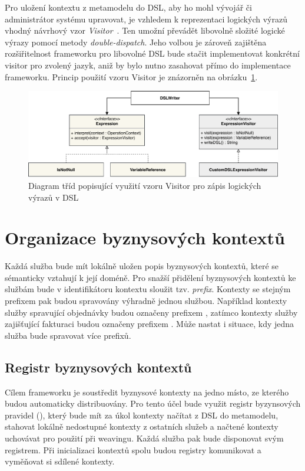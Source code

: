 Pro uložení kontextu z metamodelu do \gls{DSL}, aby ho mohl vývojář či administrátor
systému upravovat, je vzhledem k reprezentaci logických výrazů vhodný návrhový vzor
\textit{Visitor}~\cite{fowler2002patterns}. Ten umožní převádět libovolně složité logické
výrazy pomocí metody \textit{double-dispatch}. Jeho volbou je zároveň zajištěna rozšiřitelnost
frameworku pro libovolné \gls{DSL} \textendash\xspace bude stačit implementovat konkrétní
visitor pro zvolený jazyk, aniž by bylo nutno zasahovat přímo do implementace frameworku.
Princip použití vzoru Visitor je znázorněn na obrázku~\ref{fig:expression-visitor}.

\begin{figure}
    \centering
    \includegraphics[keepaspectratio=true, width=1\linewidth]{figures/expression-visitor.pdf}
    \caption{Diagram tříd popisující využití vzoru Visitor pro zápis logických výrazů v \gls{DSL}}
    \label{fig:expression-visitor}
\end{figure}

\section{Organizace byznysových kontextů}

Každá služba bude mít lokálně uložen popis byznysových kontextů, které se sémanticky vztahují
k její doméně. Pro snažší přidělení byznysových kontextů ke službám bude v identifikátoru kontextu sloužit
tzv. \textit{prefix}. Kontexty se stejným prefixem pak budou spravovány výhradně jednou službou. Například kontexty
služby spravující objednávky budou označeny prefixem , zatímco kontexty služby zajišťující fakturaci budou
označeny prefixem . Může nastat i situace, kdy jedna služba bude spravovat více prefixů.

\subsection{Registr byznysových kontextů}

Cílem frameworku je soustředit byznysové kontexty na jedno místo, ze kterého budou
automaticky distribuovány. Pro tento účel bude využit registr byzynsových pravidel
(), který bude mít za úkol kontexty načítat z \gls{DSL} do metamodelu,
stahovat lokálně nedostupné kontexty z ostatních služeb a načtené kontexty uchovávat pro použití při weavingu.
Každá služba pak bude disponovat svým registrem. Při inicializaci kontextů spolu budou registry komunikovat
a vyměňovat si sdílené kontexty.

